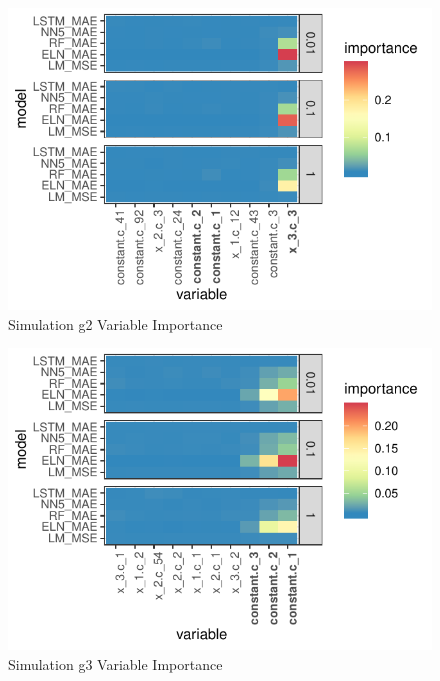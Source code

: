 \documentclass[11pt, a4paper, table]{article}
\begin{document}
\begin{figure}
	\includegraphics[]{../Results/simulation/graphics/simulation_g2_vi.pdf}
	\caption{Simulation g2 Variable Importance}
\end{figure}

\begin{figure}
	\includegraphics[]{../Results/simulation/graphics/simulation_g3_vi.pdf}
	\caption{Simulation g3 Variable Importance}
\end{figure}

\end{document}
